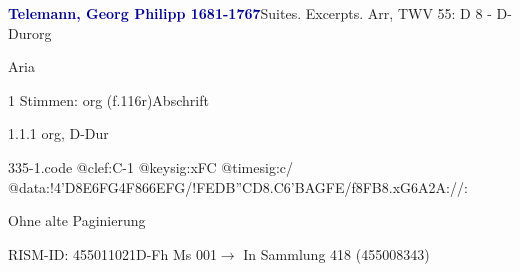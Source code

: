 \documentclass[twocolumn, 12pt]{book}
\begin{document}
\par \vspace{16pt} \textcolor{darkblue}{\textbf{Telemann, Georg Philipp  1681-1767}}\hfillplus{\textbf{[335]}}\newline Suites. Excerpts. Arr, TWV 55: D 8 - D-Dur\newline org
\par \begin{itshape}[f.116r, heading:] Aria\end{itshape} 
\par \textcolor{darkblue}{}  1 Stimmen: org  (f.116r)\newline Abschrift
\par 1.1.1  org, D-Dur  
\begin{filecontents*}{335-1.code}
@clef:C-1
@keysig:xFC
@timesig:c/
@data:!4'D{8E6FG}4F{866EFG}/!{FED}{B''CD}{8.C6'B}{AGFE}/f{8FB}{8.xG6A}2A://:
\end{filecontents*}
\newline %
\par Ohne alte Paginierung
\par RISM-ID: 455011021\newline D-Fh  Ms 001\newline $\rightarrow$ In Sammlung 418 (455008343)
      
\end{document}
